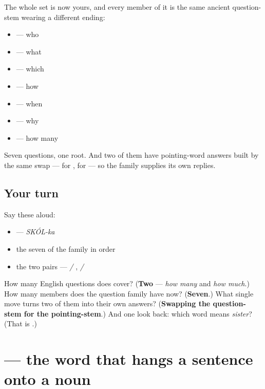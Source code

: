 \begin{grammarlens}[title={Grammar lens — seven words, one stem}]
The whole set is now yours, and every member of it is the same ancient question-stem wearing a different ending:

\begin{itemize}
\raggedright
  \item \textbf{} — who
  \item \textbf{} — what
  \item \textbf{} — which
  \item \textbf{} — how
  \item \textbf{} — when
  \item \textbf{} — why
  \item \textbf{} — how many
\end{itemize}

Seven questions, one root. And two of them have pointing-word answers built by the same swap — \textbf{} for \textbf{}, \textbf{} for \textbf{} — so the family supplies its own replies.
\end{grammarlens}

\subsection*{Your turn}
Say these aloud:

\begin{itemize}
\raggedright
  \item \emph{} — \emph{SKÓL-ka}
  \item the seven of the family in order
  \item the two pairs — \emph{ / }, \emph{ / }
\end{itemize}

\begin{tcolorbox}[breakable,colback=teal!4,colframe=teal!35!black,title={Before you move on}]
How many English questions does \textbf{} cover? (\textbf{Two} — \emph{how many} and \emph{how much}.) How many members does the question family have now? (\textbf{Seven}.) What single move turns two of them into their own answers? (\textbf{Swapping the question-stem for the pointing-stem}.) And one look back: which word means \emph{sister}? (That is \textbf{}.)
\end{tcolorbox}
\section[\texorpdfstring{\ru{который} (katóryy)}{который (katóryy)}]{ — the word that hangs a sentence onto a noun}

